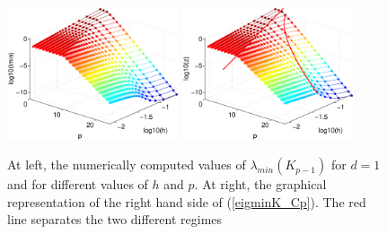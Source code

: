 \documentclass[11pt]{article}
\begin{document}
\begin{figure}[h]
\begin{center}
\includegraphics[width=0.45\textwidth]{Images/igap_eigK1min.eps}\quad
\includegraphics[width=0.45\textwidth]{Images/igap_eigK1smin.eps}\\
\end{center}
\caption{At left, the numerically computed values of
$\lambda_{min}(K_{p-1})$ for $d=1$ and
for different values of $h$ and $p$. At right,
the graphical representation of the right hand side of (\ref{eigminK_Cp}). The red line
separates the two different regimes}
\label{fig:stiffmin-igapd1}
\end{figure}
\end{document}
